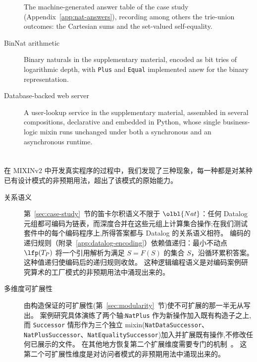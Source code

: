 \begin{CJK*}{UTF8}{gbsn}
\begin{description}
    The machine-generated answer table of the case study
    (Appendix~\ref{app:nat-answers}), recording among others the trie-union
    outcomes: the Cartesian sums and the set-valued self-equality.
  \item[BinNat arithmetic]
    Binary naturals in the supplementary
    material, encoded as bit tries of
    logarithmic depth, with \texttt{Plus} and
    \texttt{Equal} implemented anew for the binary representation.
  \item[Database-backed web server]
    A user-lookup service in the supplementary
    material, assembled in several
    compositions, declarative and embedded in Python, whose single
    business-logic mixin runs unchanged under both a synchronous and an
    asynchronous runtime.
\end{description}
\fi

\section{}
\label{sec:emergent-phenomena}

\ifPaperChinese
在 MIXINv2 中开发真实程序的过程中，我们发现了三种现象，每一种都是对某种已有设计模式的非预期用法，超出了该模式的原始能力。

\begin{description}
  \item[关系语义]
    第~\ref{sec:case-study}~节的笛卡尔积语义不限于 $\olbl{Nat}$：任何 Datalog 元组都可编码为链表，而深度合并在这些元组上计算集合操作;在我们测试套件中的每个编码程序上,所得答案都与 Datalog 的关系语义相符。
    编码的递归规则（附录~\ref{app:datalog-encoding}）依赖值递归：最小不动点 $\lfp(T_P)$ 将一个引用解析为满足 $S = F(S)$ 的集合 $S$，沿循环累积答案。
    这种值递归使编码后的递归规则收敛。
    这种逻辑编程语义是对编码案例研究算术的工厂模式的非预期用法中涌现出来的。

  \item[多维度可扩展性]\label{item:multi-dimensional-extensibility}
    \begin{sloppypar}
    由构造保证的可扩展性(第~\ref{sec:modularity}~节)使不可扩展的那一半无从写出。
    案例研究具体演练了两个轴:\texttt{NatPlus} 作为新操作加入既有构造子之上,而 \texttt{Successor} 情形作为三个独立 mixin(\texttt{NatDataSuccessor}、\texttt{NatPlusSuccessor}、\texttt{NatEqualitySuccessor})加入并扩展既有操作,不修改任何已展示的文件。
    在其他地方恢复第二个扩展维度需要专门的机制~\cite{liang1995-monad-transformers, lammel2003-scrap-your-boilerplate, loh2006-open-data-types, swierstra2008-data-types-a-la-carte, carette2009-finally-tagless, oliveira2012-object-algebras, kiselyov2013-extensible-effects, wu2014-effect-handlers-in-scope, kiselyov2015-freer-monads, wang2016-expression-problem-trivially, leijen2017-row-typed-algebraic-effects, poulsen2023-hefty-algebras}。
    这第二个可扩展性维度是对访问者模式的非预期用法中涌现出来的。
    \end{sloppypar}


\end{description}
\end{CJK*}
